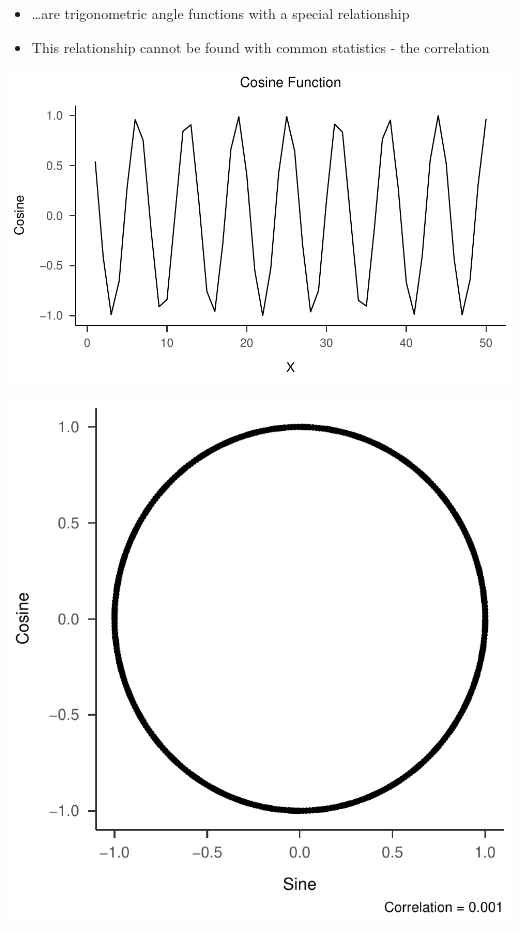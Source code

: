 \documentclass[
]{book}
\providecommand{\tightlist}{%
  \setlength{\itemsep}{0pt}\setlength{\parskip}{0pt}}
\begin{document}
\begin{itemize}
\tightlist
\item
  \ldots are trigonometric angle functions with a special relationship
\item
  This relationship cannot be found with common statistics - the correlation
\end{itemize}

\includegraphics{_main_files/figure-latex/unnamed-chunk-46-1.pdf}

\includegraphics{_main_files/figure-latex/unnamed-chunk-47-1.pdf}
\end{document}

